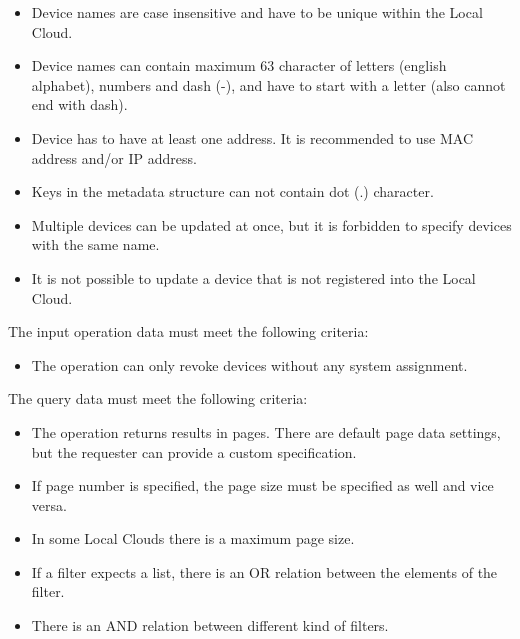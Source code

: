 \documentclass[a4paper]{arrowhead}
\begin{document}
\begin{itemize}
    \item Device names are case insensitive and have to be unique within the Local Cloud.
    \item Device names can contain maximum 63 character of letters (english alphabet), numbers and dash (-), and have to start with a letter (also cannot end with dash).
    \item Device has to have at least one address. It is recommended to use MAC address and/or IP address.
    \item Keys in the metadata structure can not contain dot (.) character.
    \item Multiple devices can be updated at once, but it is forbidden to specify devices with the same name.
    \item It is not possible to update a device that is not registered into the Local Cloud.
\end{itemize}


The input operation data must meet the following criteria:

\begin{itemize}
    \item The operation can only revoke devices without any system assignment.
\end{itemize}


The query data must meet the following criteria:

\begin{itemize}
    \item The operation returns results in pages. There are default page data settings, but the requester can provide a custom specification.
    \item If page number is specified, the page size must be specified as well and vice versa.
    \item In some Local Clouds there is a maximum page size.
    \item If a filter expects a list, there is an OR relation between the elements of the filter.
    \item There is an AND relation between different kind of filters.
\end{itemize}

\end{document}
